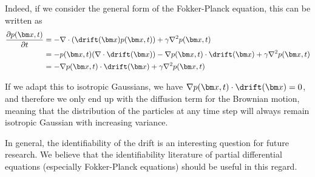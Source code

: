 Indeed, if we consider the general form of the Fokker-Planck equation, this can be written as
\begin{align*}
    \frac{\partial p(\bm x, t)}{\partial t} &= -\nabla\cdot (\drift(\bm x)p(\bm x, t))+\gamma \nabla^2 p(\bm x, t)\\
    &=-p(\bm x, t) (\nabla\cdot \drift(\bm x)) - \nabla p(\bm x, t)\cdot \drift(\bm x) + \gamma \nabla^2 p(\bm x, t)\\
    &=- \nabla p(\bm x, t)\cdot \drift(\bm x) + \gamma \nabla^2 p(\bm x, t)\\
\end{align*}

If we adapt this to isotropic Gaussians, we have $\nabla p(\bm x, t)\cdot \drift(\bm x)=0$, and therefore we only end up with the diffusion term for the Brownian motion, meaning that the distribution of the particles at any time step will always remain isotropic Gaussian with increasing variance. 


In general, the identifiability of the drift is an interesting question for future research. We believe that the identifiability literature of partial differential equations (especially Fokker-Planck equations) should be useful in this regard.


